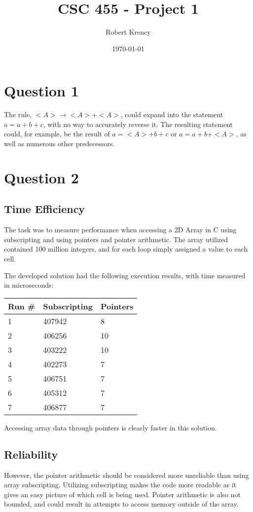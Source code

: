 \documentclass[12pt]{article}
\title{CSC 455 - Project 1}
\author{Robert Krency}
\date{\today}
\begin{document}
\maketitle

\pagebreak
\section{Question 1}
The rule, $<A> \to <A> + <A>$, could expand into the statement $a = a + b + c$, with no way to accurately reverse it.
The resulting statement could, for example, be the result of $a = <A> + b + c$ or $a = a + b + <A>$, as well as numerous other predecessors. 

\section{Question 2}
\subsection{Time Efficiency}
The task was to measure performance when accessing a 2D Array in C using subscripting and using pointers and pointer arithmetic.
The array utilized contained 100 million integers, and for each loop simply assigned a value to each cell.

The developed solution had the following execution results, with time measured in microseconds:

\begin{tabular}{l l l}
    Run \# & Subscripting & Pointers \\ \hline
    1 & 407942 & 8 \\
    2 & 406256 & 10 \\
    3 & 403222 & 10 \\
    4 & 402273 & 7 \\
    5 & 406751 & 7 \\
    6 & 405312 & 7 \\
    7 & 406877 & 7 \\

\end{tabular}

Accessing array data through pointers is clearly faster in this solution.

\subsection{Reliability}
However, the pointer arithmetic should be considered more unreliable than using array subscripting.
Utilizing subscripting makes the code more readable as it gives an easy picture of which cell is being used.
Pointer arithmetic is also not bounded, and could result in attempts to access memory outside of the array.
\end{document}
